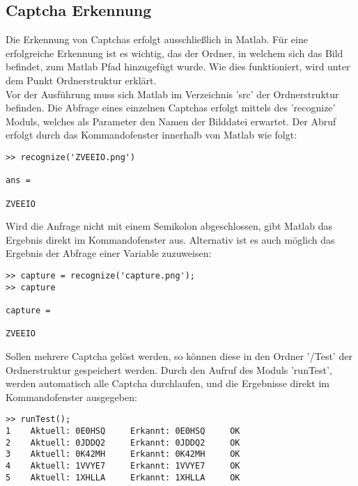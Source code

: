 \subsection{Captcha Erkennung}
Die Erkennung von Captchas erfolgt ausschließlich in Matlab. Für eine erfolgreiche Erkennung ist es wichtig, das der Ordner, in welchem sich das Bild befindet, zum Matlab Pfad hinzugefügt wurde. Wie dies funktioniert, wird unter dem Punkt Ordnerstruktur erklärt.\\
Vor der Ausführung muss sich Matlab im Verzeichnis 'src' der Ordnerstruktur befinden. Die Abfrage eines einzelnen Captchas erfolgt mittels des 'recognize' Moduls, welches als Parameter den Namen der Bilddatei erwartet. Der Abruf erfolgt durch das Kommandofenster innerhalb von Matlab wie folgt:
\begin{verbatim}
>> recognize('ZVEEIO.png')

ans =

ZVEEIO
\end{verbatim} 
Wird die Anfrage nicht mit einem Semikolon abgeschlossen, gibt Matlab das Ergebnis direkt im Kommandofenster aus. Alternativ ist es auch möglich das Ergebnis der Abfrage einer Variable zuzuweisen:
\begin{verbatim}
>> capture = recognize('capture.png');
>> capture

capture =

ZVEEIO
\end{verbatim} 
$\;$ \\
Sollen mehrere Captcha gelöst werden, so können diese in den Ordner '/Test' der Ordnerstruktur gespeichert werden. Durch den Aufruf des Moduls 'runTest', werden automatisch alle Captcha durchlaufen, und die Ergebnisse direkt im Kommandofenster ausgegeben:
\begin{verbatim}
>> runTest();
1	 Aktuell: 0E0HSQ	 Erkannt: 0E0HSQ	 OK
2	 Aktuell: 0JDDQ2	 Erkannt: 0JDDQ2	 OK
3	 Aktuell: 0K42MH	 Erkannt: 0K42MH	 OK
4	 Aktuell: 1VVYE7	 Erkannt: 1VVYE7	 OK
5	 Aktuell: 1XHLLA	 Erkannt: 1XHLLA	 OK
\end{verbatim} 